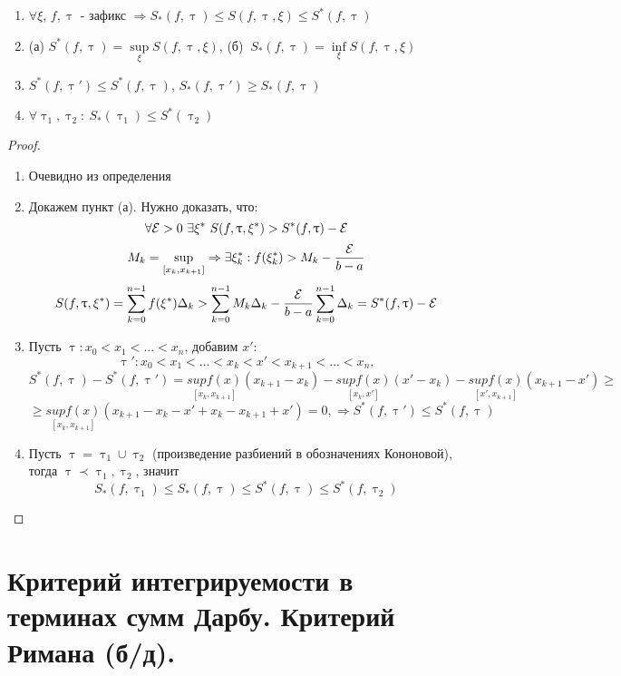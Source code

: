 \documentclass[12pt, fleqn]{article}
\begin{document}
\begin{properties}
    \begin{enumerate}
        \item $\forall \xi$, $f, \uptau$ - зафикс $\Rightarrow S_*(f,\uptau) \leqslant S(f, \uptau, \xi) \leqslant S^*(f, \uptau)$
        \item (а) $S^*(f, \uptau) = \sup\limits_\xi S(f, \uptau, \xi)$, (б) $\ S_*(f, \uptau) = \inf\limits_\xi S(f, \uptau, \xi)$
        \item $S^*(f, \uptau') \leqslant S^*(f, \uptau)$, $S_*(f, \uptau') \geqslant S_*(f, \uptau)$
        \item $\forall \uptau_1, \uptau_2:\ S_*(\uptau_1) \leqslant S^*(\uptau_2)$
    \end{enumerate}
\end{properties}

\begin{proof}
    \begin{enumerate}
        \item Очевидно из определения
        \item Докажем пункт (а). Нужно доказать, что:
        $$\forall \mathcal{E} > 0\ \exists \xi^* \ S(f, \uptau, \xi^*) > S^* (f, \uptau) - \mathcal{E}$$
        $$M_k=\sup\limits_{[x_k,x_{k+1}]} \Rightarrow \exists \xi_k^*: f(\xi_k^*) > M_k - \frac{\mathcal{E}}{b-a}$$
        $$S(f, \uptau, \xi^*)=\sum\limits_{k=0}^{n-1} f(\xi^*) \Delta_k > \sum\limits_{k=0}^{n-1} M_k \Delta_k - \frac{\mathcal{E}}{b-a} \sum\limits_{k=0}^{n-1} \Delta_k = S^*(f, \uptau)-\mathcal{E}$$
        \item Пусть $\uptau: x_0<x_1<...<x_n$, добавим $x'$: 
        $$\uptau': x_0<x_1<...<x_k<x'<x_{k+1}<...<x_n,$$
        $$S^*(f,\uptau)-S^*(f,\uptau')=\underset{[x_k,x_{k+1}]}{sup f(x)}(x_{k+1}-x_k) - \underset{[x_k,x']}{sup f(x)}(x'-x_k) - \underset{[x',x_{k+1}]}{sup f(x)} (x_{k+1}-x') \geqslant$$ $$\geqslant \underset{[x_k,x_{k+1}]}{sup f(x)} (x_{k+1}-x_k-x'+x_k-x_{k+1}+x') = 0, \Rightarrow S^*(f, \uptau') \leqslant S^*(f, \uptau)$$
        \item Пусть $\uptau = \uptau_1 \cup \uptau_2$ (произведение разбиений в обозначениях Кононовой), тогда $\uptau \prec \uptau_1, \uptau_2$, значит 
        $$S_*(f, \uptau_1) \leqslant S_*(f, \uptau) \leqslant S^*(f, \uptau) \leqslant S^*(f, \uptau_2)$$
    \end{enumerate}
\end{proof}

\newpage
\section{Критерий интегрируемости в терминах сумм Дарбу. Критерий Римана (б/д).}
 
\end{document}
